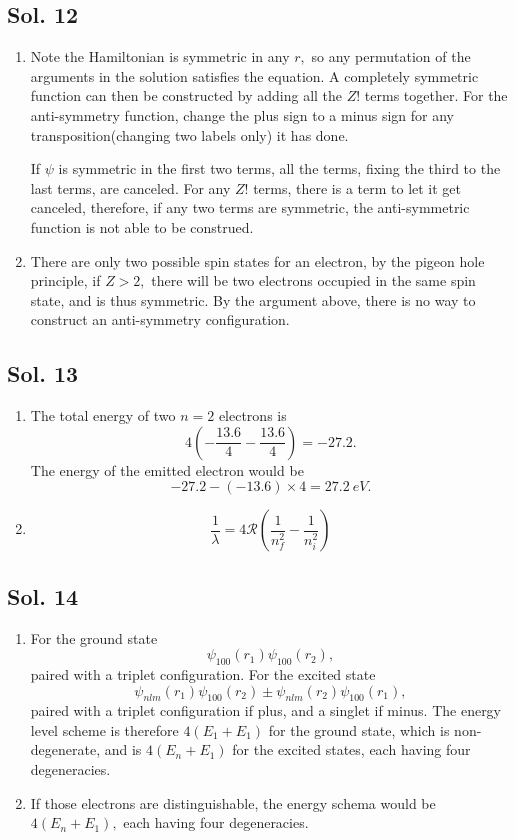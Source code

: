    \subsection*{Sol. 12}
   \begin{enumerate}
       \item Note the Hamiltonian is symmetric in any $r,$ so any permutation of the arguments in the solution satisfies the equation. A completely symmetric function can then be constructed by adding all the $Z!$ terms together. For the anti-symmetry function, change the plus sign to a minus sign for any transposition(changing two labels only) it has done.

        If $\psi$ is symmetric in the first two terms, all the terms, fixing the third to the last terms, are canceled. For any $Z!$ terms, there is a term to let it get canceled, therefore, if any two terms are symmetric, the anti-symmetric function is not able to be construed.
        \item 
        There are only two possible spin states for an electron, by the pigeon hole principle, if $Z>2,$ there will be two electrons occupied in the same spin state, and is thus symmetric. By the argument above, there is no way to construct an anti-symmetry configuration.
        
   \end{enumerate}

   \subsection*{Sol. 13}
   \begin{enumerate}
       \item The total energy of two $n=2$ electrons is 
       $$
       4(-\frac{13.6}{4}-\frac{13.6}{4})=-27.2.
       $$
       The energy of the emitted electron would be 
       $$
       -27.2 - (-13.6)\times 4 = \qty{27.2}{eV}.
       $$
       \item 
       $$
       \frac{1}{\lambda}
       =4\mathcal{R}(\frac{1}{n_f^2}-\frac{1}{n_i^2})
       $$
   \end{enumerate}
   \subsection*{Sol. 14}
   \begin{enumerate}
       \item 
       For the ground state
       $$
       \psi_{100}(r_1)\psi_{100}(r_2),
       $$
       paired with a triplet configuration.
        For the excited state
       $$
       \psi_{nlm}(r_1)\psi_{100}(r_2)\pm \psi_{nlm}(r_2)\psi_{100}(r_1),
       $$
       paired with a triplet configuration if plus, and a singlet if minus.
        The energy level scheme is therefore $4(E_1+E_1)$ for the ground state, which is non-degenerate, and is $4(E_n+E_1)$ for the excited states, each having four degeneracies.
       \item  If those electrons are distinguishable, the energy schema would be $4(E_n+E_1),$ each having four degeneracies.
       
   \end{enumerate}
